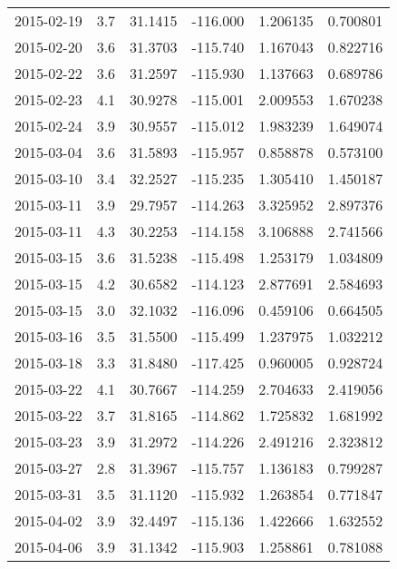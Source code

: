 \begin{tabular}{lrrrrr}
2015-02-19 &       3.7 &  31.1415 &  -116.000 &         1.206135 &         0.700801 \\
2015-02-20 &       3.6 &  31.3703 &  -115.740 &         1.167043 &         0.822716 \\
2015-02-22 &       3.6 &  31.2597 &  -115.930 &         1.137663 &         0.689786 \\
2015-02-23 &       4.1 &  30.9278 &  -115.001 &         2.009553 &         1.670238 \\
2015-02-24 &       3.9 &  30.9557 &  -115.012 &         1.983239 &         1.649074 \\
2015-03-04 &       3.6 &  31.5893 &  -115.957 &         0.858878 &         0.573100 \\
2015-03-10 &       3.4 &  32.2527 &  -115.235 &         1.305410 &         1.450187 \\
2015-03-11 &       3.9 &  29.7957 &  -114.263 &         3.325952 &         2.897376 \\
2015-03-11 &       4.3 &  30.2253 &  -114.158 &         3.106888 &         2.741566 \\
2015-03-15 &       3.6 &  31.5238 &  -115.498 &         1.253179 &         1.034809 \\
2015-03-15 &       4.2 &  30.6582 &  -114.123 &         2.877691 &         2.584693 \\
2015-03-15 &       3.0 &  32.1032 &  -116.096 &         0.459106 &         0.664505 \\
2015-03-16 &       3.5 &  31.5500 &  -115.499 &         1.237975 &         1.032212 \\
2015-03-18 &       3.3 &  31.8480 &  -117.425 &         0.960005 &         0.928724 \\
2015-03-22 &       4.1 &  30.7667 &  -114.259 &         2.704633 &         2.419056 \\
2015-03-22 &       3.7 &  31.8165 &  -114.862 &         1.725832 &         1.681992 \\
2015-03-23 &       3.9 &  31.2972 &  -114.226 &         2.491216 &         2.323812 \\
2015-03-27 &       2.8 &  31.3967 &  -115.757 &         1.136183 &         0.799287 \\
2015-03-31 &       3.5 &  31.1120 &  -115.932 &         1.263854 &         0.771847 \\
2015-04-02 &       3.9 &  32.4497 &  -115.136 &         1.422666 &         1.632552 \\
2015-04-06 &       3.9 &  31.1342 &  -115.903 &         1.258861 &         0.781088 \\

\end{tabular}
